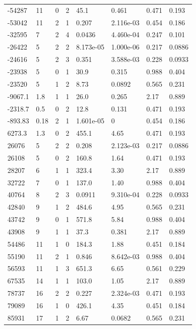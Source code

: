 \documentclass[preview]{standalone}
\begin{document}
{{\begin{tabular}{L{1.2cm}C{1.2cm} C{0.3cm}C{0.5cm} C{1.4cm}C{1.4cm} C{1.4cm}C{1.4cm}}
  -54287  &    11  & 0     &  2 &  45.1  & 0.461  & 0.471 &  0.193   \\ 
  -53042  &    11  & 2     &  1 &  0.207  & 2.116e-03  & 0.454 &  0.186   \\ 
  -32595  &     7  & 2     &  4 &  0.0436  & 4.460e-04  & 0.247 &  0.101   \\ 
  -26422  &     5  & 2     &  2 &  8.173e-05  & 1.000e-06  & 0.217 &  0.0886   \\ 
  -24616  &     5  & 2     &  3 &  0.351  & 3.588e-03  & 0.228 &  0.0933   \\ 
  -23938  &     5  & 0     &  1 &  30.9  & 0.315  & 0.988 &  0.404   \\ 
  -23520  &     5  & 1     &  2 &  8.73  & 0.0892  & 0.565 &  0.231   \\ 
  -9067.1  &   1.8  & 1     &  1 &  26.0  & 0.265  & 2.17 &  0.889   \\ 
  -2318.7  &   0.5  & 0     &  2 &  12.8  & 0.131  & 0.471 &  0.193   \\ 
  -893.83  &  0.18  & 2     &  1 &  1.601e-05  & 0  & 0.454 &  0.186   \\ 
  6273.3  &   1.3  & 0     &  2 &  455.1  & 4.65  & 0.471 &  0.193   \\ 
  26076  &     5  & 2     &  2 &  0.208  & 2.123e-03  & 0.217 &  0.0886   \\ 
  26108  &     5  & 0     &  2 &  160.8  & 1.64  & 0.471 &  0.193   \\ 
  28207  &     6  & 1     &  1 &  323.4  & 3.30  & 2.17 &  0.889   \\ 
  32722  &     7  & 0     &  1 &  137.0  & 1.40  & 0.988 &  0.404   \\ 
  40764  &     8  & 2     &  3 &  0.0911  & 9.310e-04  & 0.228 &  0.0933   \\ 
  42840  &     9  & 1     &  2 &  484.6  & 4.95  & 0.565 &  0.231   \\ 
  43742  &     9  & 0     &  1 &  571.8  & 5.84  & 0.988 &  0.404   \\ 
  43908  &     9  & 1     &  1 &  37.3  & 0.381  & 2.17 &  0.889   \\ 
  54486  &    11  & 1     &  0 &  184.3  & 1.88  & 0.451 &  0.184   \\ 
  55190  &    11  & 2     &  1 &  0.846  & 8.642e-03  & 0.988 &  0.404   \\ 
  56593  &    11  & 1     &  3 &  651.3  & 6.65  & 0.561 &  0.229   \\ 
  67535  &    14  & 1     &  1 &  103.0  & 1.05  & 2.17 &  0.889   \\ 
  78737  &    16  & 2     &  2 &  0.227  & 2.324e-03  & 0.471 &  0.193   \\ 
  79089  &    16  & 1     &  0 &  426.1  & 4.35  & 0.451 &  0.184   \\ 
  85931  &    17  & 1     &  2 &  6.67  & 0.0682  & 0.565 &  0.231   \\ 
\hline 
\end{tabular} 

}}
\end{document}
